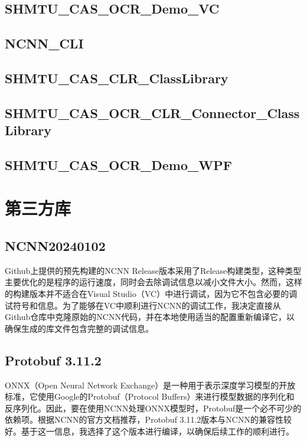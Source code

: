 \subsection{SHMTU\_CAS\_OCR\_Demo\_VC}

\subsection{NCNN\_CLI}

\subsection{SHMTU\_CAS\_CLR\_ClassLibrary}

\subsection{SHMTU\_CAS\_OCR\_CLR\_Connector\_ClassLibrary}

\subsection{SHMTU\_CAS\_OCR\_Demo\_WPF}

\section{第三方库}

\subsection{NCNN20240102}

Github上提供的预先构建的NCNN Release版本采用了Release构建类型，这种类型主要优化的是程序的运行速度，同时会去除调试信息以减小文件大小。然而，这样的构建版本并不适合在Visual Studio（VC）中进行调试，因为它不包含必要的调试符号和信息。为了能够在VC中顺利进行NCNN的调试工作，我决定直接从Github仓库中克隆原始的NCNN代码，并在本地使用适当的配置重新编译它，以确保生成的库文件包含完整的调试信息。

\subsection{Protobuf 3.11.2}

ONNX（Open Neural Network Exchange）是一种用于表示深度学习模型的开放标准，它使用Google的Protobuf（Protocol Buffers）来进行模型数据的序列化和反序列化。因此，要在使用NCNN处理ONNX模型时，Protobuf是一个必不可少的依赖项。根据NCNN的官方文档推荐，Protobuf 3.11.2版本与NCNN的兼容性较好。基于这一信息，我选择了这个版本进行编译，以确保后续工作的顺利进行。

